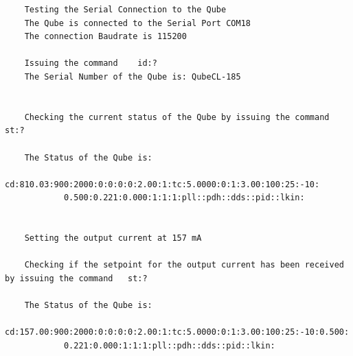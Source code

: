 \begin{lstlisting}
    Testing the Serial Connection to the Qube
    The Qube is connected to the Serial Port COM18
    The connection Baudrate is 115200
    
    Issuing the command    id:?
    The Serial Number of the Qube is: QubeCL-185
    
    
    Checking the current status of the Qube by issuing the command   st:?
    
    The Status of the Qube is: 
        cd:810.03:900:2000:0:0:0:0:2.00:1:tc:5.0000:0:1:3.00:100:25:-10:
            0.500:0.221:0.000:1:1:1:pll::pdh::dds::pid::lkin:
    
    
    Setting the output current at 157 mA
    
    Checking if the setpoint for the output current has been received by issuing the command   st:?
    
    The Status of the Qube is:                      
        cd:157.00:900:2000:0:0:0:0:2.00:1:tc:5.0000:0:1:3.00:100:25:-10:0.500:
            0.221:0.000:1:1:1:pll::pdh::dds::pid::lkin:    
\end{lstlisting}